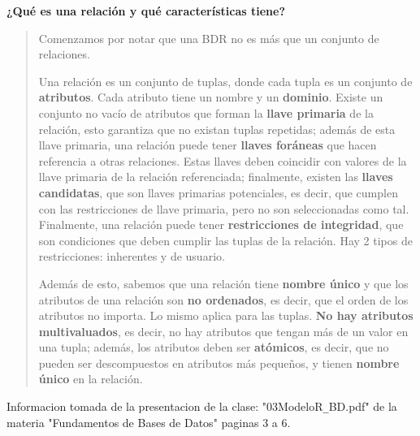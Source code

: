 \textbf{¿Qué es una relación y qué características tiene?}\vspace{.2cm}
\begin{quote}
    Comenzamos por notar que una BDR no es más que un conjunto de relaciones.\vspace{.2cm}
    
    Una relación es un conjunto de tuplas, donde cada tupla es un conjunto de \textbf{atributos}. Cada atributo tiene un nombre y un \textbf{dominio}. Existe un conjunto no vacío de atributos que forman la \textbf{llave primaria} de la relación, esto garantiza que no existan tuplas repetidas; además de esta llave primaria, una relación puede tener \textbf{llaves foráneas} que hacen referencia a otras relaciones. Estas llaves deben coincidir con valores de la llave primaria de la relación referenciada; finalmente, existen las \textbf{llaves candidatas}, que son llaves primarias potenciales, es decir, que cumplen con las restricciones de llave primaria, pero no son seleccionadas como tal. Finalmente, una relación puede tener \textbf{restricciones de integridad}, que son condiciones que deben cumplir las tuplas de la relación. Hay 2 tipos de restricciones: inherentes y de usuario. \vspace{.2cm}

    Además de esto, sabemos que una relación tiene \textbf{nombre único} y que los atributos de una relación son \textbf{no ordenados}, es decir, que el orden de los atributos no importa. Lo mismo aplica para las tuplas. \textbf{No hay atributos multivaluados}, es decir, no hay atributos que tengan más de un valor en una tupla; además, los atributos deben ser \textbf{atómicos}, es decir, que no pueden ser descompuestos en atributos más pequeños, y tienen \textbf{nombre único} en la relación.
\end{quote}

Informacion tomada de la presentacion de la clase: "03ModeloR\texttt{\_}BD.pdf" de la materia "Fundamentos de Bases de Datos" paginas 3 a 6. \vspace{.2cm}